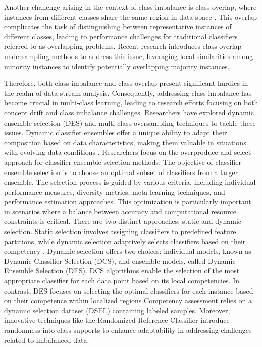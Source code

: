 Another challenge arising in the context of class imbalance is class overlap, where instances from different classes share the same region in data space \cite{bhowan2012evolving, galar2011review}. This overlap complicates the task of distinguishing between representative instances of different classes, leading to performance challenges for traditional classifiers referred to as overlapping problems. Recent research introduces class-overlap undersampling methods to address this issue, leveraging local similarities among minority instances to identify potentially overlapping majority instances.

Therefore, both class imbalance and class overlap present significant hurdles in the realm of data stream analysis. Consequently, addressing class imbalance has become crucial in multi-class learning, leading to research efforts focusing on both concept drift and class imbalance challenges. Researchers have explored dynamic ensemble selection (DES) and multi-class oversampling techniques to tackle these issues. Dynamic classifier ensembles offer a unique ability to adapt their composition based on data characteristics, making them valuable in situations with evolving data conditions \cite{cruz2018dynamic}. Researchers focus on the overproduce-and-select approach for classifier ensemble selection methods. The objective of classifier ensemble selection is to choose an optimal subset of classifiers from a larger ensemble. The selection process is guided by various criteria, including individual performance measures, diversity metrics, meta-learning techniques, and performance estimation approaches. This optimization is particularly important in scenarios where a balance between accuracy and computational resource constraints is critical. There are two distinct approaches: static and dynamic selection. Static selection involves assigning classifiers to predefined feature partitions, while dynamic selection adaptively selects classifiers based on their competency \cite{kuncheva2000clustering}. Dynamic selection offers two choices: individual models, known as Dynamic Classifier Selection (DCS), and ensemble models, called Dynamic Ensemble Selection (DES). DCS algorithms enable the selection of the most appropriate classifier for each data point based on its local competencies. In contrast, DES focuses on selecting the optimal classifiers for each instance based on their competence within localized regions \cite{woloszynski2011probabilistic, lysiak2014optimal, cruz2017meta} Competency assessment relies on a dynamic selection dataset (DSEL) containing labeled samples. Moreover, innovative techniques like the Randomized Reference Classifier introduce randomness into class supports to enhance adaptability in addressing challenges related to imbalanced data.

